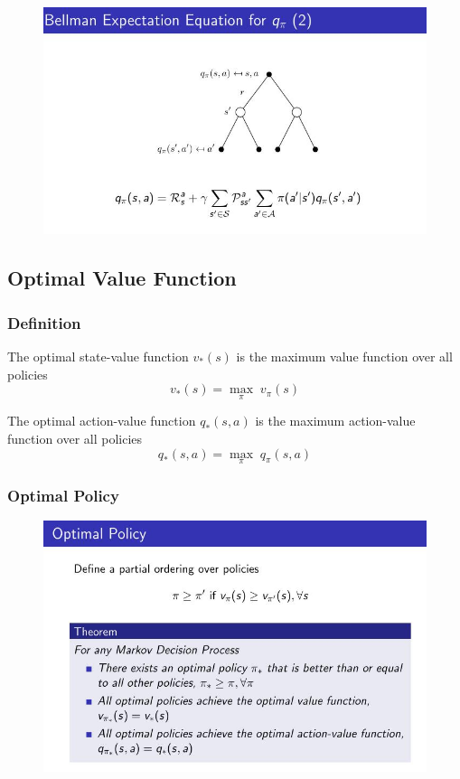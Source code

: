 \documentclass[10pt, a4paper, twocolumn]{article} %
\begin{document}
\begin{figure}[H]
	\begin{centering}
		\includegraphics[width = \linewidth]{bellmanQpi.jpg}
	\end{centering}
\end{figure}

\subsection{Optimal Value Function}

\subsubsection{Definition}
The optimal state-value function $v_{*}(s)$ is the maximum value function over all policies
$$v_{*}(s) = \underset{\pi}\max \; v_{\pi}(s)$$

The optimal action-value function $q_{*}(s,a)$ is the maximum action-value function over all policies
$$ q_{*}(s,a) = \underset{\pi}\max \; q_{\pi}(s,a) $$

\subsubsection{Optimal Policy}
\begin{figure}[H]
	\begin{centering}
		\includegraphics[width = \linewidth]{OptPolicy.jpg}
	\end{centering}
\end{figure}
\end{document}
